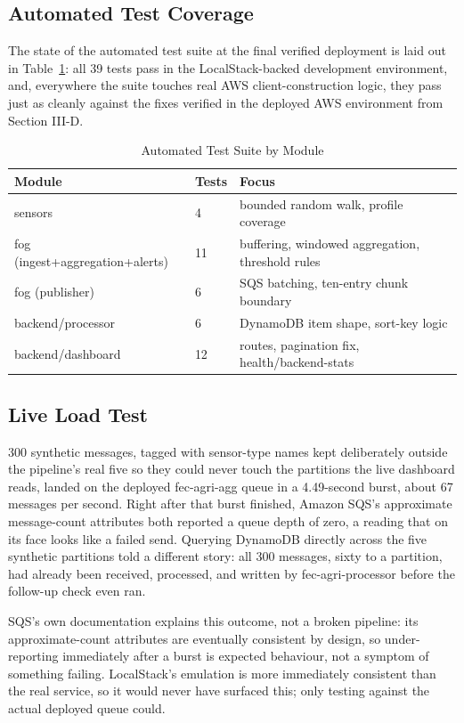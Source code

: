 \documentclass[conference]{IEEEtran}
\begin{document}
\subsection{Automated Test Coverage}
The state of the automated test suite at the final verified deployment is laid out in Table~\ref{tab:tests}: all 39 tests pass in the LocalStack-backed development environment, and, everywhere the suite touches real AWS client-construction logic, they pass just as cleanly against the fixes verified in the deployed AWS environment from Section III-D.

\begin{table}[!t]
\caption{Automated Test Suite by Module}
\label{tab:tests}
\centering
\footnotesize
\begin{tabular}{|p{10.5em}|p{2.5em}|p{11.5em}|}
\hline
\textbf{Module} & \textbf{Tests} & \textbf{Focus} \\
\hline
sensors & 4 & bounded random walk, profile coverage \\
\hline
fog (ingest+aggregation+alerts) & 11 & buffering, windowed aggregation, threshold rules \\
\hline
fog (publisher) & 6 & SQS batching, ten-entry chunk boundary \\
\hline
backend/processor & 6 & DynamoDB item shape, sort-key logic \\
\hline
backend/dashboard & 12 & routes, pagination fix, health/backend-stats \\
\hline
\end{tabular}
\end{table}

\subsection{Live Load Test}
300 synthetic messages, tagged with sensor-type names kept deliberately outside the pipeline's real five so they could never touch the partitions the live dashboard reads, landed on the deployed fec-agri-agg queue in a 4.49-second burst, about 67 messages per second. Right after that burst finished, Amazon SQS's approximate message-count attributes both reported a queue depth of zero, a reading that on its face looks like a failed send. Querying DynamoDB directly across the five synthetic partitions told a different story: all 300 messages, sixty to a partition, had already been received, processed, and written by fec-agri-processor before the follow-up check even ran.

SQS's own documentation explains this outcome, not a broken pipeline: its approximate-count attributes are eventually consistent by design, so under-reporting immediately after a burst is expected behaviour, not a symptom of something failing. LocalStack's emulation is more immediately consistent than the real service, so it would never have surfaced this; only testing against the actual deployed queue could.
\end{document}
